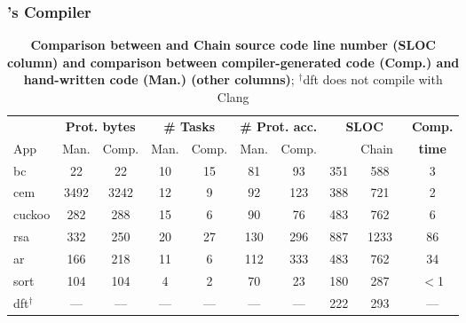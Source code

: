 \subsubsection{\sys's Compiler}
\label{sec:result_compiler_time}

\begin{table}[t]
	\centering
	\footnotesize
	\renewcommand{\tabcolsep}{1pt}
	\begin{tabular}{|l|cc|cc|cc|cc|c|}
		\hline
		{} & \multicolumn{2}{c|}{{\bf Prot. bytes}} & \multicolumn{2}{c|}{{\bf \# Tasks}} & \multicolumn{2}{c|}{{\bf \# Prot. acc.}} & \multicolumn{2}{c|}{\bf SLOC} & {\bf Comp.} \\
		App & Man. & Comp. & Man. & Comp. & Man. & Comp. & \multicolumn{1}{l}{\sys} & \multicolumn{1}{r|}{Chain~\cite{chain}} & {\bf time} \\
		\hline\hline
		bc & 22 & 22 & 10 & 15 & 81 & 93 & 351 &588 & 3\\
		cem & 3492 & 3242 & 12 & 9 & 92 & 123 & 388 &721 & 2\\
		cuckoo & 282 & 288 & 15 & 6 & 90 & 76 & 483 &762 & 6\\
		rsa & 332 & 250 & 20 & 27 & 130 & 296 & 887 &1233 & 86\\
		ar & 166 & 218 & 11 & 6 & 112 & 333 & 483 &762 & 34\\
		sort & 104 & 104 & 4 & 2 & 70 & 23 & 180 & 287 & $<$1\\
		dft$^\dagger$ & --- & --- & --- & --- & --- & --- & 222 & 293 & ---\\
		\hline
	\end{tabular}
	\caption{\textbf{Comparison between \sys and Chain source code line number (SLOC column) and comparison between compiler-generated \sys code (Comp.) and hand-written \sys code (Man.) (other columns)}; $^\dagger$dft does not compile with Clang }\label{table:compiler_result}\vspace{-0.5cm}
\end{table}

%

